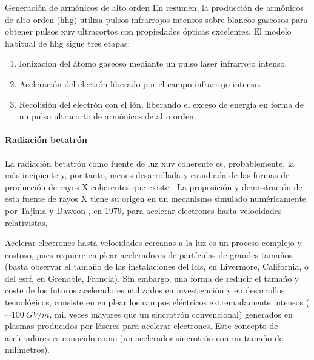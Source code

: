 \begin{footheorem*}{Generación de armónicos de alto orden}
  En resumen, la producción de armónicos de alto orden (\acrshort{hhg}) utiliza pulsos infrarrojos intensos sobre blancos gaseosos para obtener pulsos \acrshort{xuv} ultracortos con propiedades ópticas excelentes. El modelo habitual de \acrshort{hhg} sigue tres etapas: 
    \begin{enumerate}
      \item Ionización del átomo gaseoso mediante un pulso láser infrarrojo intenso.
      \item Aceleración del electrón liberado por el campo infrarrojo intenso.
      \item Recolisión del electrón con el ión, liberando el exceso de energía en forma de un pulso ultracorto de armónicos de alto orden.
    \end{enumerate}
\end{footheorem*}
 
\paragraph{Radiación betatrón}
La radiación betatrón como fuente de luz \acrshort{xuv} coherente es, probablemente, la más incipiente y, por tanto, menos desarrollada y estudiada de las formas de producción de rayos X coherentes que existe \autocite{Corde2013}. La proposición y demostración de esta fuente de rayos X tiene su origen en un mecanismo simulado numéricamente por Tajima y Dawson \autocite{Tajima1979}, en 1979, para acelerar electrones hasta velocidades relativistas.

Acelerar electrones hasta velocidades cercanas a la luz es un proceso complejo y costoso, pues requiere emplear aceleradores de partículas de grandes tamaños (basta observar el tamaño de las instalaciones del \acrshort{lcls}, en Livermore, California, o del \acrfull{esrf}, en Grenoble, Francia). Sin embargo, una forma de reducir el tamaño y coste de los futuros aceleradores utilizados en investigación y en desarrollos tecnológicos, consiste en emplear los campos eléctricos extremadamente intensos ($\sim \qty{100}{GV/m}$, mil veces mayores que un sincrotrón convencional) generados en plasmas producidos por láseres para acelerar electrones. Este concepto de aceleradores es conocido como \emph{} (un acelerador sincrotrón con un tamaño de milímetros).

